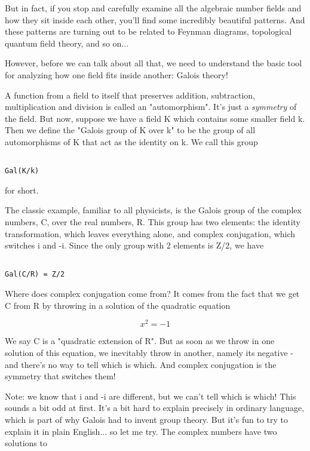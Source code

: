 But in fact, if you stop and carefully examine all the algebraic number 
fields and how they sit inside each other, you'll find some incredibly 
beautiful patterns.  And these patterns are turning out to be related to 
Feynman diagrams, topological quantum field theory, and so on...

However, before we can talk about all that, we need to understand the
basic tool for analyzing how one field fits inside another: Galois theory!

A function from a field to itself that preserves addition, subtraction,
multiplication and division is called an "automorphism".  It's just
a \emph{symmetry} of the field.  But now, suppose we have a field K which 
contains some smaller field k.  Then we define the "Galois group of K 
over k" to be the group of all automorphisms of K that act as the 
identity on k.  We call this group


\begin{verbatim}

Gal(K/k)
\end{verbatim}
    
for short.

The classic example, familiar to all physicists, is the Galois group of 
the complex numbers, C, over the real numbers, R.  This group has two 
elements: the identity transformation, which leaves everything alone, and 
complex conjugation, which switches i and -i.  Since the only group with 2
elements is Z/2, we have


\begin{verbatim}

Gal(C/R) = Z/2
\end{verbatim}
    
Where does complex conjugation come from?  It comes from the fact that
we get C from R by throwing in a solution of the quadratic equation 


$$

x^{2} = -1
$$
    
We say C is a "quadratic extension of R".  But as soon as we throw in one 
solution of this equation, we inevitably throw in another, namely its 
negative - and there's no way to tell which is which.  And complex 
conjugation is the symmetry that switches them!  

Note: we know that i and -i are different, but we can't tell which is 
which!  This sounds a bit odd at first.  It's a bit hard to explain
precisely in ordinary language, which is part of why Galois had to invent 
group theory.  But it's fun to try to explain it in plain English... 
so let me try.  The complex numbers have two solutions to


